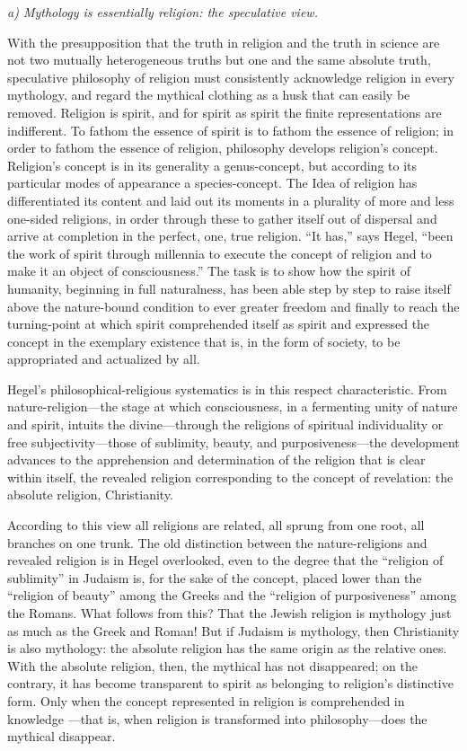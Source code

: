 \documentclass[12pt,a4paper]{article}
\begin{document}
\medskip

\noindent\textit{a) Mythology is essentially religion: the speculative view.}

\medskip

With the presupposition that the truth in religion and the truth
in science are not two mutually heterogeneous truths but one and
the same absolute truth, speculative philosophy of religion must
consistently acknowledge religion in every mythology, and regard
the mythical clothing as a husk that can easily be removed.
Religion is spirit, and for spirit as spirit the finite
representations are indifferent. To fathom the essence of spirit
is to fathom the essence of religion; in order to fathom the
essence of religion, philosophy develops religion's concept.
Religion's concept is in its generality a genus-concept, but
according to its particular modes of appearance a
species-concept. The Idea of religion has differentiated its
content and laid out its moments in a plurality of more and less
one-sided religions, in order through these to gather itself out
of dispersal and arrive at completion in the perfect, one, true
religion. ``It has,'' says Hegel, ``been the work of spirit
through millennia to execute the concept of religion and to make
it an object of consciousness.'' The task is to show how the
spirit of humanity, beginning in full naturalness, has been able
step by step to raise itself above the nature-bound condition to
ever greater freedom and finally to reach the turning-point at
which spirit comprehended itself as spirit and expressed the
concept in the exemplary existence that is, in the form of
society, to be appropriated and actualized by all.

Hegel's philosophical-religious systematics is in this respect
characteristic. From nature-religion---the stage at which
consciousness, in a fermenting unity of nature and spirit,
intuits the divine---through the religions of spiritual
individuality or free subjectivity---those of sublimity,
beauty, and purposiveness---the development advances to the
apprehension and determination of the religion that is clear
within itself, the revealed religion corresponding to the
concept of revelation: the absolute religion, Christianity.

According to this view all religions are related, all sprung from
one root, all branches on one trunk. The old distinction between
the nature-religions and revealed religion is in Hegel
overlooked, even to the degree that the ``religion of sublimity''
in Judaism is, for the sake of the concept, placed lower than the
``religion of beauty'' among the Greeks and the ``religion of
purposiveness'' among the Romans. What follows from this? That
the Jewish religion is mythology just as much as the Greek and
Roman! But if Judaism is mythology, then Christianity is also
mythology: the absolute religion has the same origin as the
relative ones. With the absolute religion, then, the mythical
has not disappeared; on the contrary, it has become transparent
to spirit as belonging to religion's distinctive form. Only when
the concept represented in religion is comprehended in knowledge
---that is, when religion is transformed into philosophy---does
the mythical disappear.
\end{document}
